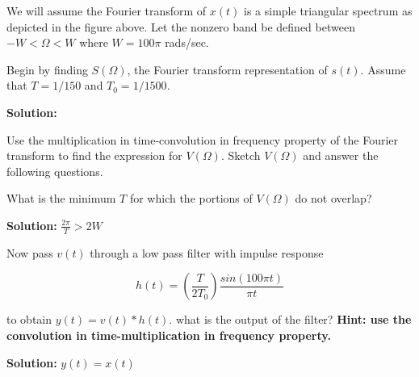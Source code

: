 \documentclass[12pt]{article}
\newenvironment{solution}{\vspace{2mm}\color{blue}\textbf{Solution: }}{\color{black}}
\begin{document}
\begin{enumerate}[\qquad 1)]
\begin{figure}[htbp]
    \label{fig:reconstruction}
\end{figure}

We will assume the Fourier transform of $x(t)$ is a simple triangular spectrum as depicted in the figure above. Let the nonzero band be defined between $-W < \Omega < W$ where $W = 100\pi$ rads/sec.

Begin by finding $S(\Omega)$, the Fourier transform representation of $s(t)$.
Assume that $T = 1/150$ and $T_0 = 1/1500$.

\begin{solution}
    
\end{solution}

Use the multiplication in time-convolution in frequency property of the Fourier transform to find the expression for $V(\Omega)$. Sketch $V(\Omega)$ and answer the following questions.

What is the minimum $T$ for which the portions of $V(\Omega)$ do not overlap?

\begin{solution}
    $\frac{2\pi}{T} > 2W$
\end{solution}

Now pass $v(t)$ through a low pass filter with impulse response

\[h(t) = (\frac{T}{2T_0})\frac{sin(100\pi t)}{\pi t}\]

to obtain $y(t) = v(t) * h(t)$. what is the output of the filter? \textbf{Hint: use the convolution in time-multiplication in frequency property.}

\begin{solution}
    $y(t) = x(t)$
\end{solution}

\end{enumerate}
\end{document}
